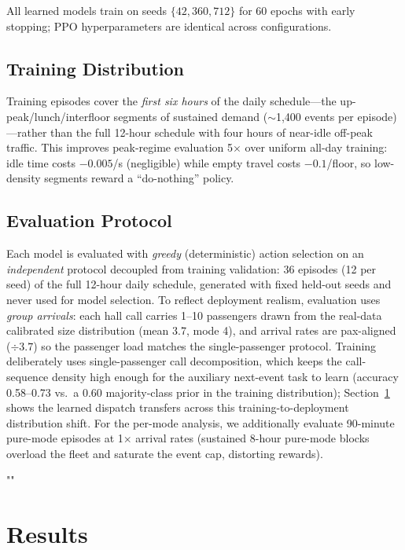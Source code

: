 \documentclass{IEEEcsmag}
\begin{document}
All learned models train on seeds $\{42, 360, 712\}$ for 60 epochs
with early stopping; PPO hyperparameters are identical across
configurations.

\subsection{Training Distribution}

Training episodes cover the \emph{first six hours} of the daily
schedule---the up-peak/lunch/interfloor segments of sustained demand
($\sim$1{,}400 events per episode)---rather than the full 12-hour
schedule with four hours of near-idle off-peak traffic. This improves
peak-regime evaluation 5$\times$ over uniform all-day training: idle
time costs $-0.005$/s (negligible) while empty travel costs
$-0.1$/floor, so low-density segments reward a ``do-nothing''
policy.

\subsection{Evaluation Protocol}

Each model is evaluated with \emph{greedy} (deterministic) action
selection on an \emph{independent} protocol decoupled from training
validation: 36 episodes (12 per seed) of the full 12-hour daily
schedule, generated with fixed held-out seeds and never used for
model selection. To reflect deployment realism, evaluation uses
\emph{group arrivals}: each hall call carries 1--10 passengers drawn
from the real-data calibrated size distribution (mean 3.7, mode 4),
and arrival rates are pax-aligned ($\div 3.7$) so the passenger load
matches the single-passenger protocol. Training deliberately uses
single-passenger call decomposition, which keeps the call-sequence
density high enough for the auxiliary next-event task to learn
(accuracy 0.58--0.73 vs.~a 0.60 majority-class prior in the
training distribution); Section~\ref{sec:results}
shows the learned dispatch transfers across this
training-to-deployment distribution shift.
For the per-mode analysis, we additionally evaluate 90-minute
pure-mode episodes at 1$\times$ arrival rates (sustained 8-hour
pure-mode blocks overload the fleet and saturate the event cap,
distorting rewards).

""\\\section{Results}
\label{sec:results}
\end{document}
